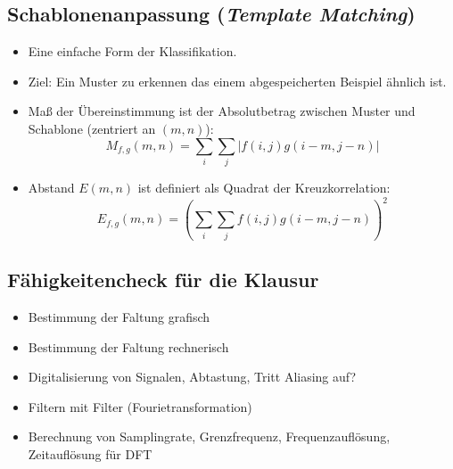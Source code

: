 \subsection{Schablonenanpassung (\textsl{Template Matching})}
\begin{itemize}
\item Eine einfache Form der Klassifikation.
\item Ziel: Ein Muster zu erkennen das einem abgespeicherten Beispiel ähnlich ist.
\item Maß der Übereinstimmung ist der Absolutbetrag zwischen Muster und Schablone (zentriert an $(m,n)$): $$M_{f,g}(m,n) = \sum\limits_i \sum\limits_j | f(i,j) g(i-m,j-n)|$$
\item Abstand $E(m,n)$ ist definiert als Quadrat der Kreuzkorrelation: $$E_{f,g} (m,n) = \left( \sum\limits_i \sum\limits_j f(i,j) g(i-m,j-n) \right)^2$$
\end{itemize}


\subsection{Fähigkeitencheck für die Klausur}
\begin{itemize}
	\item Bestimmung der Faltung grafisch
	\item Bestimmung der Faltung rechnerisch
	\item Digitalisierung von Signalen, Abtastung, Tritt Aliasing auf?
	\item Filtern mit Filter (Fourietransformation)
	\item Berechnung von Samplingrate, Grenzfrequenz, Frequenzauflösung, Zeitauflösung für DFT
\end{itemize}

